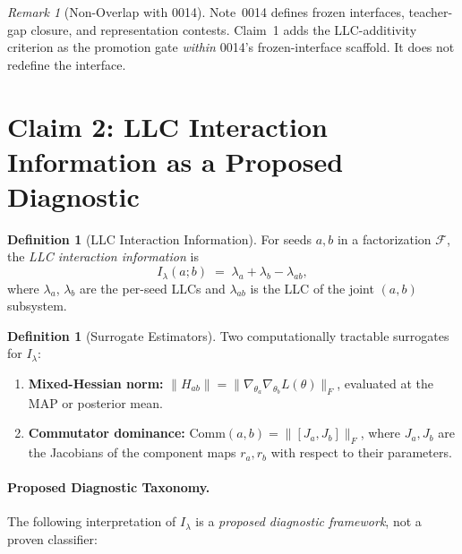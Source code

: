 \documentclass[11pt,a4paper]{article}
\theoremstyle{definition}
\newtheorem{definition}[theorem]{Definition}
\theoremstyle{remark}
\newtheorem{remark}[theorem]{Remark}
\newcommand{\LLC}{\lambda}
\newcommand{\Ilambda}{I_{\lambda}}
\newcommand{\Comm}{\mathrm{Comm}}
\newcommand{\cF}{\mathcal{F}}
\begin{document}
\begin{remark}[Non-Overlap with 0014]\label{rem:nonoverlap}
  Note~0014 defines frozen interfaces, teacher-gap closure, and representation
  contests.  Claim~1 adds the LLC-additivity criterion as the promotion gate
  \emph{within} 0014's frozen-interface scaffold.  It does not redefine the
  interface.
\end{remark}

\section{Claim 2: LLC Interaction Information as a Proposed Diagnostic}%
\label{sec:claim2}

\begin{definition}[LLC Interaction Information]\label{def:Ilambda}
  For seeds $a, b$ in a factorization $\cF$, the \emph{LLC interaction
  information} is
  \begin{equation}\label{eq:Ilambda}
    \Ilambda(a; b) \;=\; \LLC_a + \LLC_b - \LLC_{ab},
  \end{equation}
  where $\LLC_a$, $\LLC_b$ are the per-seed LLCs and $\LLC_{ab}$ is the LLC
  of the joint $(a,b)$ subsystem.
\end{definition}

\begin{definition}[Surrogate Estimators]\label{def:surrogates}
  Two computationally tractable surrogates for $\Ilambda$:
  \begin{enumerate}[label=(\alph*)]
    \item \textbf{Mixed-Hessian norm:}
      $\|H_{ab}\| = \|\nabla_{\theta_a}\nabla_{\theta_b} L(\theta)\|_F$,
      evaluated at the MAP or posterior mean.
    \item \textbf{Commutator dominance:}
      $\Comm(a, b) = \|[J_a, J_b]\|_F$, where $J_a, J_b$ are the Jacobians
      of the component maps $r_a, r_b$ with respect to their parameters.
  \end{enumerate}
\end{definition}

\paragraph{Proposed Diagnostic Taxonomy.}
The following interpretation of $\Ilambda$ is a \emph{proposed diagnostic
framework}, not a proven classifier:
\end{document}
